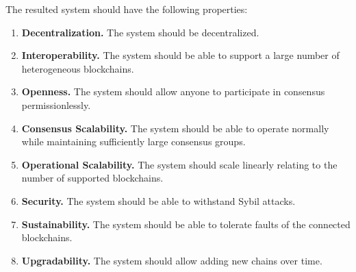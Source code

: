 The resulted system should have the following properties:

\begin{enumerate}
    \item \textbf{Decentralization.} The system should be decentralized.
    \item \textbf{Interoperability.} The system should be able to support a large number of heterogeneous blockchains.
    \item \textbf{Openness.} The system should allow anyone to participate in consensus permissionlessly.
    \item \textbf{Consensus Scalability.} The system should be able to operate normally while maintaining sufficiently large consensus groups.
    \item \textbf{Operational Scalability.} The system should scale linearly relating to the number of supported blockchains.
    \item \textbf{Security.} The system should be able to withstand Sybil attacks.
    \item \textbf{Sustainability.} The system should be able to tolerate faults of the connected blockchains.
    \item \textbf{Upgradability.} The system should allow adding new chains over time.
\end{enumerate}